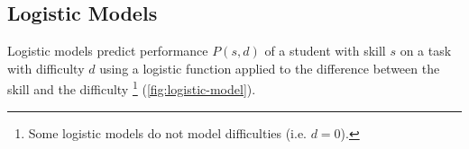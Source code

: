 %
%
%


\subsection{Logistic Models}  %
\label{sec:logistic-models}

Logistic models \cite{irt-visual-guide}  %
predict performance $P(s, d)$
of a student with skill $s$ on a task with difficulty $d$
using a logistic function applied to the difference between the skill and the difficulty%
\footnote{Some logistic models do not model difficulties (i.e. $d = 0$).}
(\cref{fig:logistic-model}).

